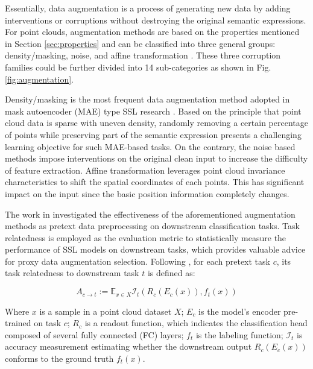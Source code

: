 \documentclass[a4paper,fleqn]{cas-dc}
\begin{document}
Essentially, data augmentation is a process of generating new data by adding interventions or corruptions without destroying the original semantic expressions. For point clouds, augmentation methods are based on the properties mentioned in Section \ref{sec:properties} and can be classified into three general groups: density/masking, noise, and affine transformation \citep{zhang2022point}. These three corruption families could be further divided into 14 sub-categories as shown in Fig. \ref{fig:augmentation}.

Density/masking is the most frequent data augmentation method adopted in mask autoencoder (MAE) type SSL research \citep{he2021masked,pang2022masked,yu2021point}. Based on the principle that point cloud data is sparse with uneven density, randomly removing a certain percentage of points while preserving part of the semantic expression presents a challenging learning objective for such MAE-based tasks. On the contrary, the noise based methods impose interventions on the original clean input to increase the difficulty of feature extraction. Affine transformation leverages point cloud invariance characteristics to shift the spatial coordinates of each points. This has significant impact on the input since the basic position information completely changes.

The work in \citep{chen2020simple,zhang2022point} investigated the effectiveness of the aforementioned augmentation methods as pretext data preprocessing on downstream classification tasks. Task relatedness is employed as the evaluation metric to statistically measure the performance of SSL models on downstream tasks, which provides valuable advice for proxy data augmentation selection. Following \citep{zamir2018taskonomy}, for each pretext task $c$, its task relatedness to downstream task $t$ is defined as:

\begin{equation}
    A_{c \to t} := \mathbb{E}_{x \in X} \mathcal{I}_{t}(R_c(E_c(x)),f_t(x))
\end{equation}

Where $x$ is a sample in a point cloud dataset $X$; $E_c$ is the model's encoder pre-trained on task $c$; $R_c$ is a readout function, which indicates the classification head composed of several fully connected (FC) layers; $f_t$ is the labeling function; $\mathcal{I}_{t}$ is accuracy measurement estimating whether the downstream output $R_c(E_c(x))$ conforms to the ground truth $f_t(x)$.
\end{document}
